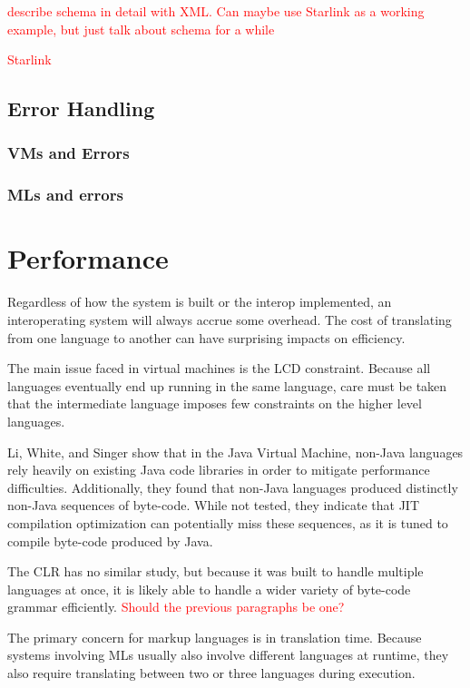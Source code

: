 \documentclass{sig-alternate}
\newcommand{\mycomment}[1]{\textcolor{red}{#1}}
\begin{document}
\mycomment{describe schema in detail with XML. Can maybe use Starlink as a working example, but just talk about schema for a while}
	
\mycomment{Starlink}



\subsection{Error Handling}\label{errors}

\subsubsection*{VMs and Errors}

\subsubsection*{MLs and errors}


\section{Performance} \label{performance}
Regardless of how the system is built or the interop implemented, an interoperating system will always accrue some overhead. The cost of translating from one language to another can have surprising impacts on efficiency. 

The main issue faced in virtual machines is the LCD constraint. Because all languages eventually end up running in the same language, care must be taken that the intermediate language imposes few constraints on the higher level languages.

Li, White, and Singer show that in the Java Virtual Machine, non-Java languages rely heavily on existing Java code libraries in order to mitigate performance difficulties. Additionally, they found that non-Java languages produced distinctly non-Java sequences of byte-code. While not tested, they indicate that JIT compilation optimization can potentially miss these sequences, as it is tuned to compile byte-code produced by Java.\cite{Li:2013}

The CLR has no similar study, but because it was built to handle multiple languages at once, it is likely able to handle a wider variety of byte-code grammar efficiently. 
\mycomment{Should the previous paragraphs be one?}

The primary concern for markup languages is in translation time. Because systems involving MLs usually also involve different languages at runtime, they also require translating between two or three languages during execution.
\end{document}
